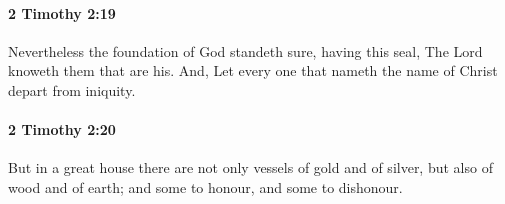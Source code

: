 		\paragraph{2 Timothy 2:19} %
			\label{2TIMOTHY-2-19}

			Nevertheless the foundation of God standeth sure, having this seal, The Lord knoweth them that are his.  And, Let every one that nameth the name of Christ depart from iniquity.

			\begin{framed}
			\scriptsize
				\begin{compactdesc}
					\item[SBLG] 
				\end{compactdesc}
			\end{framed}

		\paragraph{2 Timothy 2:20} %
			\label{2TIMOTHY-2-20}

			But in a great house there are not only vessels of gold and of silver, but also of wood and of earth; and some to honour, and some to dishonour.

